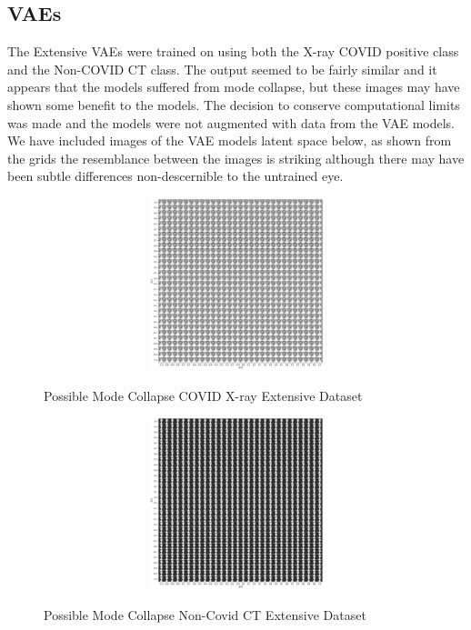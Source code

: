 \subsection{VAEs}
The Extensive VAEs were trained on using both the X-ray COVID positive class and the Non-COVID CT class.  The output seemed to be fairly similar and it appears that the models suffered from mode collapse, but these images may have shown some benefit to the models.  The decision to conserve computational limits was made and the models were not augmented with data from the VAE models.  We have included images of the VAE models latent space below, as shown from the grids the resemblance between the images is striking although there may have been subtle differences non-descernible to the untrained eye.
 \begin{figure}[H]
    \centering
    \includegraphics[width=1\textwidth,height=5cm,keepaspectratio]{Images/LatentSpaceExtensiveCOVIDXRay.png}\\
    \caption{Possible Mode Collapse COVID X-ray Extensive Dataset}
    \label{fig:Possible Mode Collapse COVID X-ray Extensive Dataset}
\end{figure}
 \begin{figure}[H]
    \centering
    \includegraphics[width=1\textwidth,height=5cm,keepaspectratio]{Images/LatentSpaceExtensiveNonCovidCT.png}\\
    \caption{Possible Mode Collapse Non-Covid CT Extensive Dataset}
    \label{fig:Possible Mode Collapse Non-Covid CT Extensive Dataset}
\end{figure}

